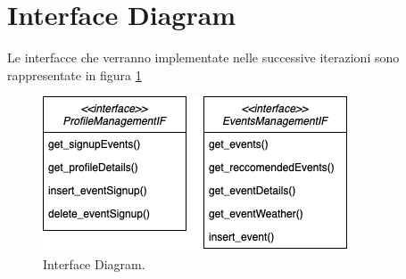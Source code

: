 \section{Interface Diagram}
Le interfacce che verranno implementate nelle successive iterazioni sono rappresentate in figura \ref{fig:InterfaceDiagram}
\begin{figure}[h!]
	\centering
	\includegraphics[width=0.8\linewidth]{diagrammi/interfacediagram.png}
	\caption{Interface Diagram.}
	\label{fig:InterfaceDiagram}
\end{figure}